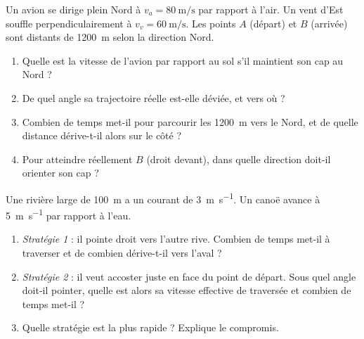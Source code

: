 \documentclass[11pt,a4paper]{article}
\newcommand{\vv}[1]{\vec{#1}}\newcommand{\ds}{\displaystyle}
\begin{document}

\begin{exo}
Un avion se dirige plein Nord à $v_a=\qty{80}{\metre\per\second}$ par rapport à l'air. Un vent d'Est
souffle perpendiculairement à $v_v=\qty{60}{\metre\per\second}$. Les points $A$ (départ) et $B$ (arrivée)
sont distants de \qty{1200}{\metre} selon la direction Nord.
\begin{center}
\end{center}
\begin{enumerate}[label=\alph*)]
  \item Quelle est la vitesse de l'avion par rapport au sol s'il maintient son cap au Nord ?
  \item De quel angle sa trajectoire réelle est-elle déviée, et vers où ?
  \item Combien de temps met-il pour parcourir les \qty{1200}{\metre} vers le Nord, et de quelle distance dérive-t-il alors sur le côté ?
  \item Pour atteindre réellement $B$ (droit devant), dans quelle direction doit-il orienter son cap ?
\end{enumerate}
\end{exo}

\begin{exo}
Une rivière large de \qty{100}{\metre} a un courant de \qty{3}{\metre\per\second}. Un canoë avance à
\qty{5}{\metre\per\second} par rapport à l'eau.
\begin{enumerate}[label=\alph*)]
  \item \emph{Stratégie 1} : il pointe droit vers l'autre rive. Combien de temps met-il à traverser et de combien dérive-t-il vers l'aval ?
  \item \emph{Stratégie 2} : il veut accoster juste en face du point de départ. Sous quel angle doit-il pointer, quelle est alors sa vitesse effective de traversée et combien de temps met-il ?
  \item Quelle stratégie est la plus rapide ? Explique le compromis.
\end{enumerate}
\end{exo}
\end{document}
